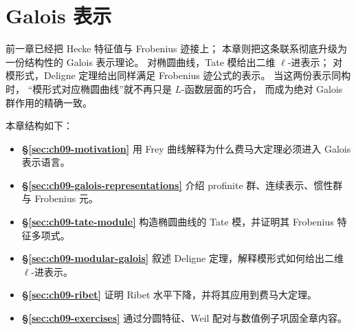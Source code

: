 \chapter{Galois 表示}
\label{ch:galois}

前一章已经把 Hecke 特征值与 Frobenius 迹接上；
本章则把这条联系彻底升级为一份结构性的 Galois 表示理论。
对椭圆曲线，Tate 模给出二维 $\ell$-进表示；
对模形式，Deligne 定理给出同样满足 Frobenius 迹公式的表示。
当这两份表示同构时，
“模形式对应椭圆曲线”就不再只是 $L$-函数层面的巧合，
而成为绝对 Galois 群作用的精确一致。

本章结构如下：
\begin{itemize}
  \item \textbf{§\ref{sec:ch09-motivation}} 用 Frey 曲线解释为什么费马大定理必须进入 Galois 表示语言。
  \item \textbf{§\ref{sec:ch09-galois-representations}} 介绍 profinite 群、连续表示、惯性群与 Frobenius 元。
  \item \textbf{§\ref{sec:ch09-tate-module}} 构造椭圆曲线的 Tate 模，并证明其 Frobenius 特征多项式。
  \item \textbf{§\ref{sec:ch09-modular-galois}} 叙述 Deligne 定理，解释模形式如何给出二维 $\ell$-进表示。
  \item \textbf{§\ref{sec:ch09-ribet}} 证明 Ribet 水平下降，并将其应用到费马大定理。
  \item \textbf{§\ref{sec:ch09-exercises}} 通过分圆特征、Weil 配对与数值例子巩固全章内容。
\end{itemize}







